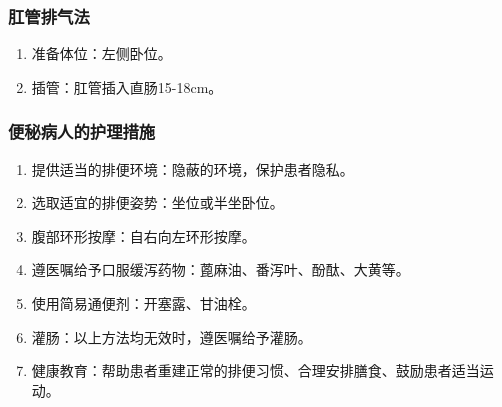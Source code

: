 \documentclass[11pt, a4paper]{ctexart}
\begin{document}
\subsubsection{肛管排气法}
\begin{enumerate}
	\item 准备体位：左侧卧位。
	\item 插管：肛管插入直肠15-18cm。
\end{enumerate}

\subsubsection{便秘病人的护理措施}
\begin{enumerate}
	\item 提供适当的排便环境：隐蔽的环境，保护患者隐私。
	\item 选取适宜的排便姿势：坐位或半坐卧位。
	\item 腹部环形按摩：自右向左环形按摩。
	\item 遵医嘱给予口服缓泻药物：蓖麻油、番泻叶、酚酞、大黄等。
	\item 使用简易通便剂：开塞露、甘油栓。
	\item 灌肠：以上方法均无效时，遵医嘱给予灌肠。
	\item 健康教育：帮助患者重建正常的排便习惯、合理安排膳食、鼓励患者适当运动。
\end{enumerate}
\end{document}
